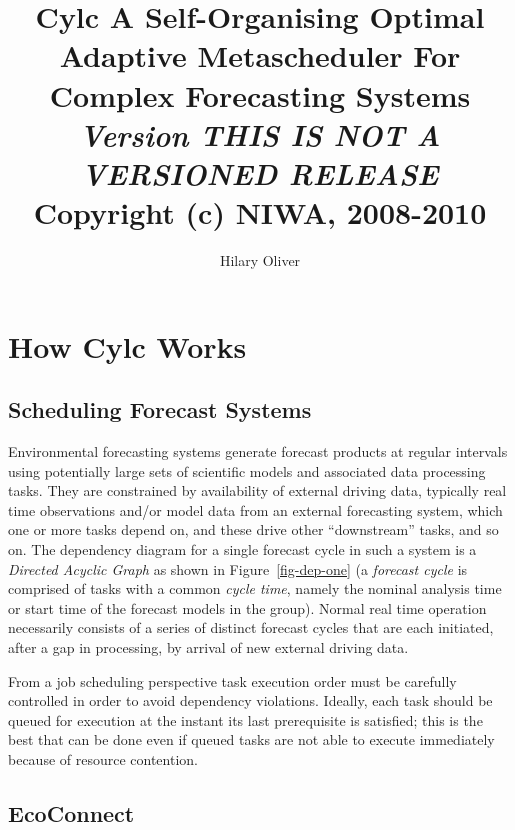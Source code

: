 \documentclass[11pt,a4paper]{article}
\title{Cylc \linebreak 
A Self-Organising Optimal Adaptive Metascheduler \linebreak 
For Complex Forecasting Systems \linebreak 
{\em \small Version THIS IS NOT A VERSIONED RELEASE} \linebreak
{\small Copyright (c) NIWA, 2008-2010} }
\author{Hilary Oliver}
\begin{document}
\maketitle

\pagebreak



\pagebreak
\tableofcontents
\listoffigures

\pagebreak
\section{How Cylc Works} 
\label{HowCylcWorks}

\subsection{Scheduling Forecast Systems} 
\label{SchedulingForecastSystems}

Environmental forecasting systems generate forecast products at regular
intervals using potentially large sets of scientific models and
associated data processing tasks. They are constrained by availability
of external driving data, typically real time observations and/or model
data from an external forecasting system, which one or more tasks depend
on, and these drive other ``downstream'' tasks, and so on. The
dependency diagram for a single forecast cycle in such a system 
is a {\em Directed Acyclic Graph} as shown in Figure~\ref{fig-dep-one}
(a {\em forecast cycle} is comprised
of tasks with a common {\em cycle time}, namely the nominal analysis
time or start time of the forecast models in the group). Normal real
time operation necessarily consists of a series of distinct forecast
cycles that are each initiated, after a gap in processing, by arrival of
new external driving data.

From a job scheduling perspective task execution order must be carefully
controlled in order to avoid dependency violations. Ideally, each task
should be queued for execution at the instant its last prerequisite is
satisfied; this is the best that can be done even if queued tasks are
not able to execute immediately because of resource contention.


\subsection{EcoConnect} 
\label{EcoConnect}
\end{document}
